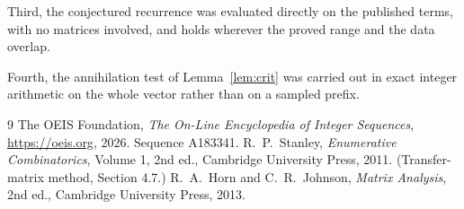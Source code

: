 \documentclass[11pt,a4paper]{article}
\theoremstyle{plain}
\theoremstyle{definition}
\begin{document}
Third, the conjectured recurrence was evaluated directly on the published terms, with no
matrices involved, and holds wherever the proved range and the data overlap.

Fourth, the annihilation test of Lemma~\ref{lem:crit} was carried out in exact integer
arithmetic on the whole vector rather than on a sampled prefix.

\begin{thebibliography}{9}
 The OEIS Foundation, \emph{The On-Line Encyclopedia of Integer
Sequences}, \url{https://oeis.org}, 2026. Sequence A183341.
 R.~P.~Stanley, \emph{Enumerative Combinatorics}, Volume 1, 2nd ed.,
Cambridge University Press, 2011. (Transfer-matrix method, Section 4.7.)
 R.~A.~Horn and C.~R.~Johnson, \emph{Matrix Analysis}, 2nd ed., Cambridge
University Press, 2013.
\end{thebibliography}
\end{document}
